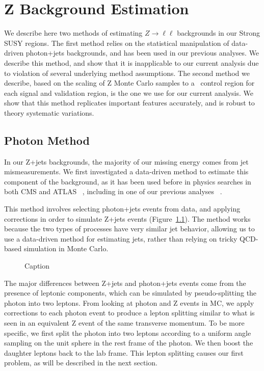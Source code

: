 \chapter{Z Background Estimation}

We describe here two methods of estimating $Z\rightarrow\ell\ell$ backgrounds in our Strong SUSY regions. The first method relies on the statistical manipulation of data-driven photon+jets backgrounds, and has been used in our previous analyses. We describe this method, and show that it is inapplicable to our current analysis due to violation of several underlying method assumptions. The second method we describe, based on the scaling of Z Monte Carlo samples to a \mindphijm\ control region for each signal and validation region, is the one we use for our current analysis. We show that this method replicates important features accurately, and is robust to theory systematic variations.

\section{Photon Method}

In our Z+jets backgrounds, the majority of our missing energy comes from jet mismeasurements. We first investigated a data-driven method to estimate this component of the background, as it has been used before in physics searches in both CMS and ATLAS ~\cite{blah}, including in one of our previous analyses ~\cite{blah}.

This method involves selecting photon+jets events from data, and applying corrections in order to simulate Z+jets events (Figure~\ref{fig:photon_to_Z}). The method works because the two types of processes have very similar jet behavior, allowing us to use a data-driven method for estimating jets, rather than relying on tricky QCD-based simulation in Monte Carlo.

\begin{figure}
    \centering
    \caption{Caption}
    \label{fig:photon_to_Z}
\end{figure}

The major differences between Z+jets and photon+jets events come from the presence of leptonic components, which can be simulated by pseudo-splitting the photon into two leptons. From looking at photon and Z events in MC, we apply corrections to each photon event to produce a lepton splitting similar to what is seen in an equivalent Z event of the same transverse momentum. To be more specific, we first split the photon into two leptons according to a uniform angle sampling on the unit sphere in the rest frame of the photon. We then boost the daughter leptons back to the lab frame. This lepton splitting causes our first problem, as will be described in the next section.

